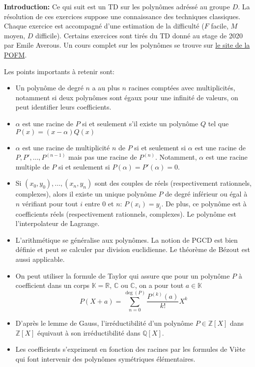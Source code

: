 \textbf{Introduction:} Ce qui suit est un TD sur les polynômes adréssé au groupe $D$. La résolution de ces exercices suppose une connaissance des techniques classiques. Chaque exercice est accompagné d'une estimation de la difficulté ($F$ facile, $M$ moyen, $D$ difficile). Certains exercices sont tirés du TD donné au stage de 2020 par Emile Averous. Un cours complet sur les polynômes se trouve sur \href{https://maths-olympiques.fr/wp-content/uploads/2017/09/polynomes.pdf}{le site de la POFM}.

Les points importants à retenir sont:
\begin{itemize}
    \item Un polynôme de degré $n$ a au plus $n$ racines comptées avec multiplicités, notamment si deux polynômes sont égaux pour une infinité de valeurs, on peut identifier leurs coefficients.
    \item $\alpha$ est une racine de $P$ si et seulement s'il existe un polynôme $Q$ tel que $P(x)=(x-\alpha)Q(x)$
    \item $\alpha$ est une racine de multiplicité $n$ de $P$ si et seulement si $\alpha$ est une racine de $P,P',\ldots,P^{(n-1)}$ mais pas une racine de $P^{(n)}$. Notamment, $\alpha$ est une racine multiple de $P$ si et seulement si $P(\alpha)=P'(\alpha)=0$.
    \item Si $(x_0,y_0),\ldots,(x_n,y_n)$ sont des couples de réels (respectivement rationnels, complexes), alors il existe un unique polynôme $P$ de degré inférieur ou égal à $n$ vérifiant pour tout $i$ entre $0$ et $n$: $P(x_i)=y_i$. De plus, ce polynôme est à coefficients réels (respectivement rationnels, complexes). Le polynôme est l'interpolateur de Lagrange.
    \item  L'arithmétique se généralise aux polynômes. La notion de PGCD est bien définie et peut se calculer par division euclidienne. Le théorème de Bézout est aussi applicable.
    \item On peut utiliser la formule de Taylor qui assure que pour un polynôme $P$ à coefficient dans un corps $\mathbb{K}=\mathbb{R}$, $\mathbb{C}$ ou $\mathbb{C}$, on a pour tout $a\in \mathbb{K}$ 
    $$P(X+a)=\sum_{n=0}^{\deg(P)}\frac{P^{(k)}(a)}{k!}X^k $$
    \item  D'après le lemme de Gauss, l'irréductibilité d'un polynôme $P\in \mathbb{Z}[X]$ dans $\mathbb{Z}[X]$ équivaut à son irréductibilité dans $\mathbb{Q}[X]$.
    \item Les coefficients s'expriment en fonction des racines par les formules de Viète qui font intervenir des polynômes symétriques élémentaires.
\end{itemize}
